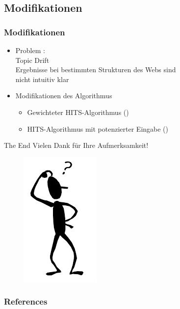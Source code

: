 \documentclass[hyperref={pdfpagelabels=false}]{beamer}
\begin{document}
\subsection{Modifikationen}
\begin{frame}

\frametitle{Modifikationen}
\begin{itemize}
\item Problem :\\
	\hspace{20pt} Topic Drift \\
	\hspace{20pt} Ergebnisse bei bestimmten Strukturen des Webs sind\\
	\hspace{20pt} nicht intuitiv klar \cite{Miller}
\item Modifikationen des Algorithmus
	\begin{itemize}
		\item Gewichteter HITS-Algorithmus (\cite{Bharat,Li, Miller})
		\item HITS-Algorithmus mit potenzierter Eingabe (\cite{Miller})
	\end{itemize}
\end{itemize}

\end{frame}


\begin{frame}{The End}
\centering
\LARGE
\color{red}
 Vielen Dank für Ihre Aufmerksamkeit!

 \nocite{Kleinberg}
 \nocite{ZheZhao2}
 \nocite{CIS}
 \nocite{HITS_Lecture4_Cornell}
 \nocite{BeamerTheme} 
\end{frame}

\begin{frame}
\centering
\begin{figure}
	\includegraphics{who.png}
\end{figure}
\end{frame}

\begin{frame}[allowframebreaks]
	\frametitle{References}
	
	
\end{frame} 
\end{document}

